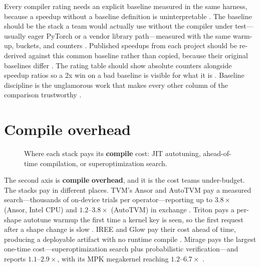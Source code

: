 Every compiler rating needs an explicit baseline measured in the same harness, because a speedup without a baseline definition is uninterpretable \citep{patel2025llminference,memoryfloor2026}. The baseline should be the stack a team would actually use without the compiler under test—usually eager PyTorch or a vendor library path—measured with the same warm-up, buckets, and counters \citep{taxbreak2026,chen2020compilerbasedhardw}. Published speedups from each project should be re-derived against this common baseline rather than copied, because their original baselines differ \citep{wu2024mirage,zheng2020ansor,mpk2025}. The rating table should show absolute counters alongside speedup ratios so a 2x win on a bad baseline is visible for what it is \citep{memoryfloor2026,patel2025llminference}. Baseline discipline is the unglamorous work that makes every other column of the comparison trustworthy \citep{chen2020compilerbasedhardw,taxbreak2026}.

\section{Compile overhead}
\label{sec:ch21_compile_overhead}


\begin{figure}[t]
\centering
{}
\caption{Where each stack pays its \textbf{compile} cost: JIT autotuning, ahead-of-time compilation, or superoptimization search.}
\label{fig:compile_overhead_architecture}
\end{figure}

The second axis is \textbf{compile} \textbf{overhead}, and it is the cost teams under-budget. The stacks pay in different places. TVM's Ansor and AutoTVM pay a measured search---thousands of on-device trials per operator---reporting up to $3.8\times$ (Ansor, Intel CPU) and $1.2$--$3.8\times$ (AutoTVM) in exchange \citep{zheng2020ansor,chen2018autotvm}. Triton pays a per-shape autotune warmup the first time a kernel key is seen, so the first request after a shape change is slow \citep{tritonlang2024}. IREE and Glow pay their cost ahead of time, producing a deployable artifact with no runtime compile \citep{iree2024,rotem2018glow}. Mirage pays the largest one-time cost---superoptimization search plus probabilistic verification---and reports $1.1$--$2.9\times$, with its MPK megakernel reaching $1.2$--$6.7\times$ \citep{wu2024mirage,mpk2025}.

